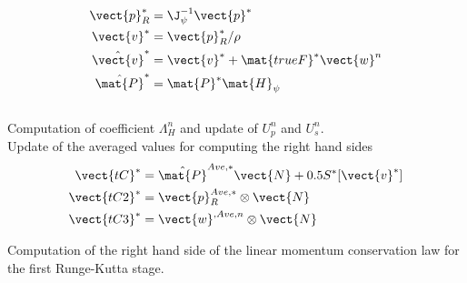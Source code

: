 \begin{algorithm}[H]
\begin{align*}
		\vect{p}_{R}^{*} &= \J_{\psi}^{-1} \vect{p}^{*} \\
		\vect{v}^{*} &= \vect{p}_{R}^{*} / \rho \\
		\hat{\vect{v}}^{*} &= \vect{v}^{*} + \mat{trueF}^{*} \vect{w}^{n} \\
		\hat{\mat{P}}^{*} &= \mat{P}^{*} \mat{H}_{\psi}
	\end{align*}\\
	\bigbreak
	Computation of coefficient $\Lambda_H^n$ and update of $U_p^{n}$ and $U_s^{n}$. \\
	\bigbreak
	Update of the averaged values for computing the right hand sides 
	\begin{align*}
		\vect{tC}^{*} &= \hat{\mat{P}}^{Ave,*} \vect{N} + 0.5 S^{*} [\vect{v}^{*}] \\
		\vect{tC2}^{*} &= \vect{p}_{R}^{Ave,*} \otimes \vect{N} \\
		\vect{tC3}^{*} &= \vect{w}^{,Ave,n} \otimes \vect{N}
	\end{align*}
	
	
	\caption{Computation of the right hand side of the linear momentum conservation law for the first Runge-Kutta stage.}
\end{algorithm}


